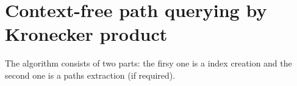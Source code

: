 \section{Context-free path querying by Kronecker product}

The algorithm consists of two parts: the firsy one is a index creation and the second one is a paths extraction (if required).



